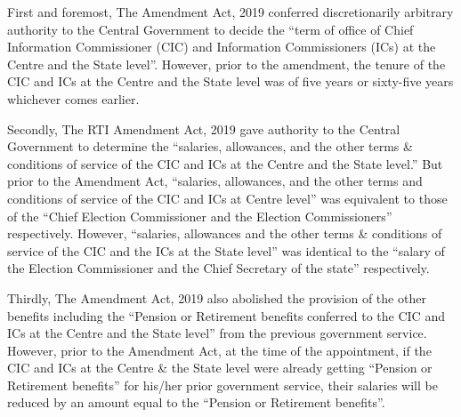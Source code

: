 \begin{multicols}{2}

\noi
First and foremost, The Amendment Act, 2019 conferred discretionarily arbitrary authority to
the Central Government to decide the “term of office of Chief Information Commissioner
(CIC) and Information Commissioners (ICs) at the Centre and the State level”. However,
prior to the amendment, the tenure of the CIC and ICs at the Centre and the State level was of
five years or sixty-five years whichever comes earlier.

\noi
Secondly, The RTI Amendment Act, 2019 gave authority to the Central Government to
determine the “salaries, allowances, and the other terms \& conditions of service of the CIC
and ICs at the Centre and the State level.” But prior to the Amendment Act, “salaries,
allowances, and the other terms and conditions of service of the CIC and ICs at Centre level”
was equivalent to those of the “Chief Election Commissioner and the Election
Commissioners” respectively. However, “salaries, allowances and the other terms
\& conditions of service of the CIC and the ICs at the State level” was identical to the “salary
of the Election Commissioner and the Chief Secretary of the state” respectively.

\noi
Thirdly, The Amendment Act, 2019 also abolished the provision of the other benefits
including the “Pension or Retirement benefits conferred to the CIC and ICs at the Centre and
the State level” from the previous government service. However, prior to the Amendment
Act, at the time of the appointment, if the CIC and ICs at the Centre \& the State level were
already getting “Pension or Retirement benefits” for his/her prior government service, their
salaries will be reduced by an amount equal to the “Pension or Retirement benefits”.
\end{multicols}



